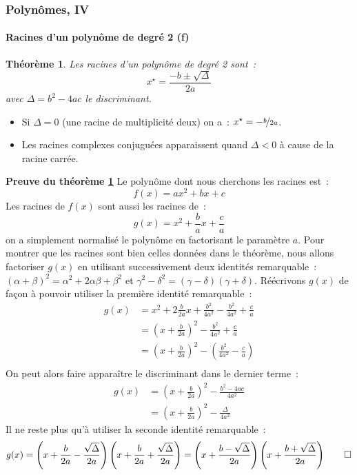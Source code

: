 \documentclass[10pt,notheorems]{beamer}
\theoremstyle{plain}
\newtheorem{theorem}{Théorème}
\theoremstyle{definition} %
\begin{document}
\begin{frame}
  \frametitle{Polynômes, IV}
  \framesubtitle{Racines d'un polynôme de degré 2 (f)}
  \hypertarget{slide_polynome_2_racines_5}{}

  \bigskip

  \begin{theorem}\label{thm:poly_2_roots}
    Les racines d'un polynôme de degré 2 sont~:
    \[
      x^{\star} = \frac{-b \pm \sqrt{\Delta}}{2a}
    \]
    avec $\Delta = b^2-4ac$ le discriminant.
  \end{theorem}

  \bigskip

  \begin{itemize}

  \item Si $\Delta=0$ (une racine de multiplicité deux) on a~: $x^{\star} = -\nicefrac{b}{2a}$.\newline

  \item Les racines complexes conjuguées apparaissent quand $\Delta<0$ à cause de la racine carrée.\newline

  \end{itemize}

\end{frame}


\begin{notes}
  \textbf{Preuve du théorème \hyperlink{slide_polynome_2_racines_5}{\ref{thm:poly_2_roots}}} Le polynôme dont nous cherchons les racines est~:
  \[
    f(x) = a x^2 + b x + c
  \]
  Les racines de $f(x)$ sont aussi les racines de~:
  \[
    g(x) = x^2 +\frac{b}{a} x + \frac{c}{a}
  \]
  on a simplement normalisé le polynôme en factorisant le paramètre $a$. Pour montrer que les racines sont bien celles données dans le théorème, nous allons factoriser $g(x)$ en utilisant successivement deux identités remarquable~: $(\alpha+\beta)^2=\alpha^2+2\alpha\beta+\beta^2$ et $\gamma^2-\delta^2 = (\gamma-\delta)(\gamma+\delta)$. Réécrivons $g(x)$ de façon à pouvoir utiliser la première identité remarquable~:
  \[
    \begin{split}
      g(x) &= x^2 + 2\frac{b}{2a} x +  \frac{b^2}{4a^2} - \frac{b^2}{4a^2} + \frac{c}{a}\\
      &= \left(x+\frac{b}{2a}\right)^2- \frac{b^2}{4a^2} + \frac{c}{a}\\
      &= \left(x+\frac{b}{2a}\right)^2- \left(\frac{b^2}{4a^2} - \frac{c}{a}\right)\\
    \end{split}
  \]
  On peut alors faire apparaître le discriminant dans le dernier terme~:
  \[
    \begin{split}
      g(x) &= \left(x+\frac{b}{2a}\right)^2- \frac{b^2-4ac}{4a^2}\\
      &= \left(x+\frac{b}{2a}\right)^2- \frac{\Delta}{4a^2}
    \end{split}
  \]
  Il ne reste plus qu'à utiliser la seconde identité remarquable~:
  \[
    g(x) = \left(x+\frac{b}{2a}-\frac{\sqrt{\Delta}}{2a}\right)\left(x+\frac{b}{2a}+\frac{\sqrt{\Delta}}{2a}\right) = \left(x+\frac{b-\sqrt{\Delta}}{2a}\right)\left(x+\frac{b+\sqrt{\Delta}}{2a}\right)\qed
  \]

\end{notes}
\end{document}
